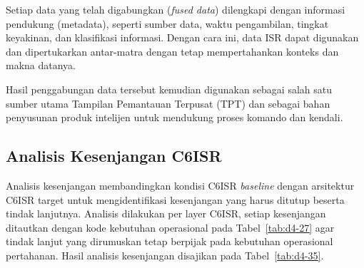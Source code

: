 Setiap data yang telah digabungkan (\textit{fused data}) dilengkapi dengan informasi pendukung (metadata), seperti sumber data, waktu pengambilan, tingkat keyakinan, dan klasifikasi informasi. Dengan cara ini, data ISR dapat digunakan dan dipertukarkan antar-matra dengan tetap mempertahankan konteks dan makna datanya.

Hasil penggabungan data tersebut kemudian digunakan sebagai salah satu sumber utama Tampilan Pemantauan Terpusat (TPT) dan sebagai bahan penyusunan produk intelijen untuk mendukung proses komando dan kendali.

\subsection{Analisis Kesenjangan C6ISR}

Analisis kesenjangan membandingkan kondisi C6ISR \textit{baseline} dengan arsitektur C6ISR target untuk mengidentifikasi kesenjangan yang harus ditutup beserta tindak lanjutnya. Analisis dilakukan per layer C6ISR, setiap kesenjangan ditautkan dengan kode kebutuhan operasional pada Tabel~\ref{tab:d4-27} agar tindak lanjut yang dirumuskan tetap berpijak pada kebutuhan operasional pertahanan. Hasil analisis kesenjangan disajikan pada Tabel~\ref{tab:d4-35}.

